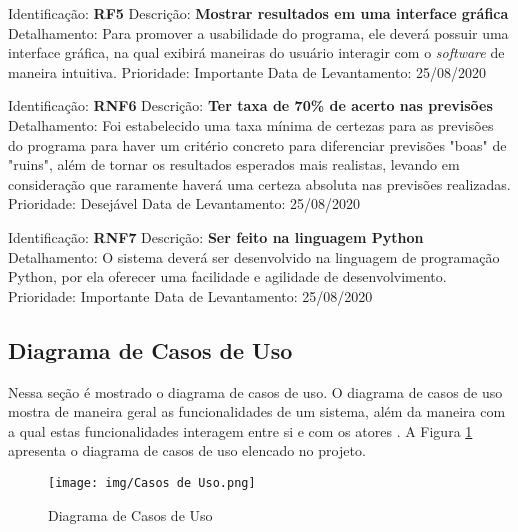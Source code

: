\documentclass[brazilian]{ifsc-tcc}
\begin{document}
Identificação: \textbf{RF5} \newline
Descrição: \textbf{Mostrar resultados em uma interface gráfica} \newline 
Detalhamento: Para promover a usabilidade do programa, ele deverá possuir uma interface gráfica, na qual exibirá maneiras do usuário interagir com o \textit{software} de maneira intuitiva. \newline 
Prioridade: Importante \newline 
Data de Levantamento: 25/08/2020 \newline

Identificação: \textbf{RNF6} \newline
Descrição: \textbf{Ter taxa de 70\% de acerto nas previsões} \newline 
Detalhamento: Foi estabelecido uma taxa mínima de certezas para as previsões do programa para haver um critério concreto para diferenciar previsões "boas" de "ruins", além de tornar os resultados esperados mais realistas, levando em consideração que raramente haverá uma certeza absoluta nas previsões realizadas.\newline 
Prioridade: Desejável \newline
Data de Levantamento: 25/08/2020 \newline

Identificação: \textbf{RNF7} \newline
Descrição: \textbf{Ser feito na linguagem Python} \newline 
Detalhamento: O sistema deverá ser desenvolvido na linguagem de programação Python, por ela oferecer uma facilidade e agilidade de desenvolvimento. \newline 
Prioridade: Importante \newline 
Data de Levantamento: 25/08/2020 \newline

\subsection{Diagrama de Casos de Uso}
Nessa seção é mostrado o diagrama de casos de uso. O diagrama de casos de uso mostra de maneira geral as funcionalidades de um sistema, além da maneira com a qual estas funcionalidades interagem entre si e com os atores \cite{diagrama-casos-uso}. A Figura \ref{fig:diagrama-casos-uso} apresenta o diagrama de casos de uso elencado no projeto.

\begin{figure}[H]
    \centering
    \caption{Diagrama de Casos de Uso}
    \texttt{[image: img/Casos de Uso.png]}
    \label{fig:diagrama-casos-uso}
\end{figure}
\end{document}
